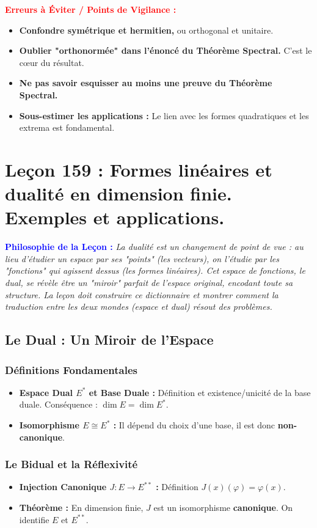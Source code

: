 \documentclass[12pt, a4paper, parskip=full]{report}
\theoremstyle{agregstyle}
\newenvironment{philosophie}
  {\par\medskip\noindent\begin{oframed}\noindent\textbf{\textcolor{blue}{Philosophie de la Leçon :}}\itshape}
  {\end{oframed}\par\medskip}
\newenvironment{erreurs}
  {\par\medskip\noindent\begin{oframed}\noindent\textbf{\textcolor{red}{Erreurs à Éviter / Points de Vigilance :}}}
  {\end{oframed}\par\medskip}
\begin{document}
\begin{erreurs}
    \begin{itemize}
        \item \textbf{Confondre symétrique et hermitien,} ou orthogonal et unitaire.
        \item \textbf{Oublier "orthonormée" dans l'énoncé du Théorème Spectral.} C'est le cœur du résultat.
        \item \textbf{Ne pas savoir esquisser au moins une preuve du Théorème Spectral.}
        \item \textbf{Sous-estimer les applications :} Le lien avec les formes quadratiques et les extrema est fondamental.
    \end{itemize}
\end{erreurs}
\chapter{Leçon 159 : Formes linéaires et dualité en dimension finie. Exemples et applications.}

\begin{philosophie}
    La dualité est un changement de point de vue : au lieu d'étudier un espace par ses "points" (les vecteurs), on l'étudie par les "fonctions" qui agissent dessus (les formes linéaires). Cet espace de fonctions, le dual, se révèle être un "miroir" parfait de l'espace original, encodant toute sa structure. La leçon doit construire ce dictionnaire et montrer comment la traduction entre les deux mondes (espace et dual) résout des problèmes.
\end{philosophie}

\section{Le Dual : Un Miroir de l'Espace}
\subsection{Définitions Fondamentales}
\begin{itemize}
    \item \textbf{Espace Dual $E^*$ et Base Duale :} Définition et existence/unicité de la base duale. Conséquence : $\dim E = \dim E^*$.
    \item \textbf{Isomorphisme $E \cong E^*$ :} Il dépend du choix d'une base, il est donc \textbf{non-canonique}.
\end{itemize}
\subsection{Le Bidual et la Réflexivité}
\begin{itemize}
    \item \textbf{Injection Canonique $J: E \to E^{**}$ :} Définition $J(x)(\varphi) = \varphi(x)$.
    \item \textbf{Théorème :} En dimension finie, $J$ est un isomorphisme \textbf{canonique}. On identifie $E$ et $E^{**}$.
\end{itemize}
\end{document}
